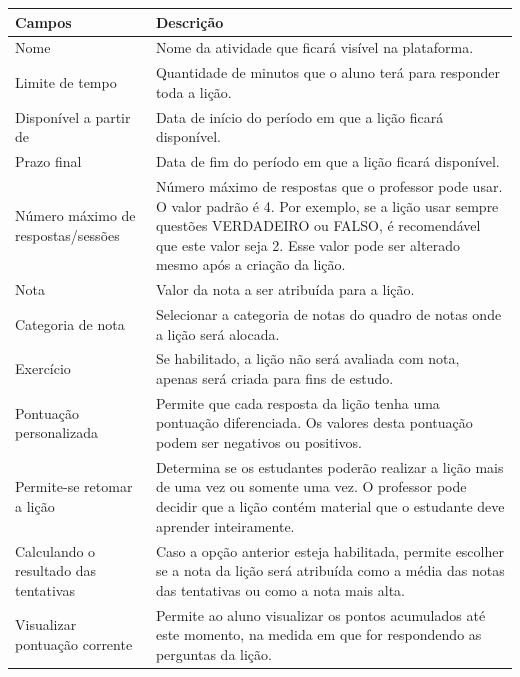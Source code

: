 \begin{longtable}{p{6cm}|p{9cm}}
   \hline
 \rowcolor[rgb]{0.8,0.8,0.8} \textbf{Campos} &  \textbf{Descrição}\\\hline
{Nome} & Nome da atividade que ficará visível na plataforma.\\\hline
{Limite de tempo} & Quantidade de minutos que o aluno terá para responder toda a lição.\\\hline
{Disponível a partir de} & Data de início do período em que a lição ficará disponível.\\\hline
{Prazo final} & Data de fim do período em que a lição ficará disponível.\\\hline
{Número máximo de respostas/sessões} & Número máximo de respostas que o professor pode usar. O valor padrão é 4. Por exemplo, se a lição usar sempre questões VERDADEIRO ou FALSO, é recomendável que este valor seja 2. Esse valor pode ser alterado mesmo após a criação da lição.\\\hline
{Nota} & Valor da nota a ser atribuída para a lição.\\\hline
{Categoria de nota} & Selecionar a categoria de notas do quadro de notas onde a lição será alocada.\\\hline
{Exercício} & Se habilitado, a lição não será avaliada com nota, apenas será criada para fins de estudo.\\\hline
{Pontuação personalizada} & Permite que cada resposta da lição tenha uma pontuação diferenciada. Os valores desta pontuação podem ser negativos ou positivos.\\\hline
{Permite-se retomar a lição} & Determina se os estudantes poderão realizar a lição mais de uma vez ou somente uma vez. O professor pode decidir que a lição contém material que o estudante deve aprender inteiramente.\\\hline
{Calculando o resultado das tentativas} & Caso a opção anterior esteja habilitada, permite escolher se a nota da lição será atribuída como a média das notas das tentativas ou como a nota mais alta.\\\hline
{Visualizar pontuação corrente} & Permite ao aluno visualizar os pontos acumulados até este momento, na medida em que for respondendo as perguntas da lição.\\\hline 
\end{longtable}


